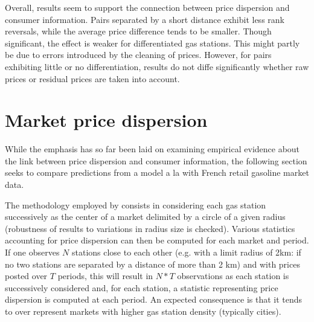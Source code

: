 \documentclass[english]{article}
\begin{document}
{{Overall, results seem to support the connection between price dispersion and consumer information. Pairs separated by a short distance exhibit less rank reversals, while the average price difference tends to be smaller. Though significant, the effect is weaker for differentiated gas stations. This might partly be due to errors introduced by the cleaning of prices. However, for pairs exhibiting little or no differentiation, results do not diffe significantly whether raw prices or residual prices are taken into account.

\section{Market price dispersion}

While the emphasis has so far been laid on examining empirical evidence about the link between price dispersion and consumer information, the following section seeks to compare predictions from a model a la \cite{VAR80} with French retail gasoline market data.

The methodology employed by \cite{TAP11} consists in considering each gas station successively as the center of a market delimited by a circle of a given radius (robustness of results to variations in radius size is checked). Various statistics accounting for price dispersion can then be computed for each market and period. If one observes $N$ stations close to each other (e.g. with a limit radius of 2km: if no two stations are separated by a distance of more than 2 km) and with prices posted over $T$ periods, this will result in $N*T$ observations as each station is successively considered and, for each station, a statistic representing price dispersion is computed at each period. An expected consequence is that it tends to over represent markets with higher gas station density (typically cities).

}}
\end{document}
